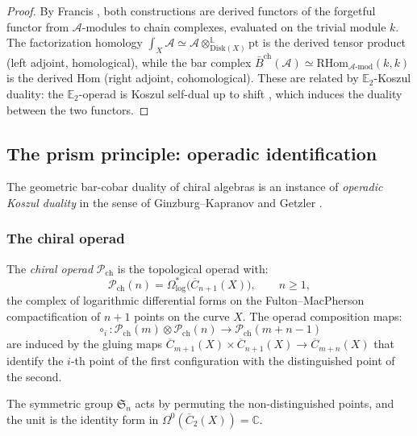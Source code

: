 \begin{proof}
By Francis \cite{Francis2013}, both constructions are derived functors of the forgetful functor from $\mathcal{A}$-modules to chain complexes, evaluated on the trivial module $k$. The factorization homology $\int_X \mathcal{A} \simeq \mathcal{A} \otimes^{\mathbb{L}}_{\mathrm{Disk}(X)} \mathrm{pt}$ is the derived tensor product (left adjoint, homological), while the bar complex $\bar{B}^{\mathrm{ch}}(\mathcal{A}) \simeq \mathrm{RHom}_{\mathcal{A}\text{-mod}}(k, k)$ is the derived Hom (right adjoint, cohomological). These are related by $\mathbb{E}_2$-Koszul duality: the $\mathbb{E}_2$-operad is Koszul self-dual up to shift \cite[Theorem~5.2]{Francis2013}, which induces the duality between the two functors.
\end{proof}

\subsection{The prism principle: operadic identification}%
\label{subsec:prism-operadic}

The geometric bar-cobar duality of chiral algebras is an instance of
\emph{operadic Koszul duality} in the sense of Ginzburg--Kapranov
\cite{GK94} and Getzler \cite{Get95}.

\subsubsection{The chiral operad}

\begin{definition}\label{def:chiral-operad}
The \emph{chiral operad} $\mathcal{P}_{\mathrm{ch}}$ is the topological
operad with:
\[
\mathcal{P}_{\mathrm{ch}}(n)
= \Omega^*_{\log}\!\bigl(\overline{C}_{n+1}(X)\bigr),
\qquad n \geq 1,
\]
the complex of logarithmic differential forms on the Fulton--MacPherson
compactification of $n+1$ points on the curve $X$.  The operad
composition maps:
\[
\circ_i \colon \mathcal{P}_{\mathrm{ch}}(m) \otimes
\mathcal{P}_{\mathrm{ch}}(n) \to \mathcal{P}_{\mathrm{ch}}(m+n-1)
\]
are induced by the gluing maps
$\overline{C}_{m+1}(X) \times \overline{C}_{n+1}(X) \to
\overline{C}_{m+n}(X)$ that identify the $i$-th point of the first
configuration with the distinguished point of the second.

The symmetric group $\mathfrak{S}_n$ acts by permuting the
non-distinguished points, and the unit is the identity form in
$\Omega^0(\overline{C}_2(X)) = \mathbb{C}$.
\end{definition}

